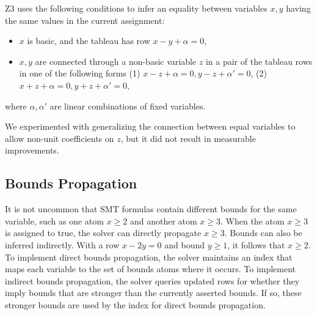 Z3 uses the following conditions to infer an equality between variables $x, y$ having the same values in the current assignment:
\begin{itemize}
    \item $x$ is basic, and the tableau has row $x - y + \alpha = 0$,
    \item $x, y$ are connected through a non-basic variable $z$ in a pair of the tableau rows in one of the following forms
	(1) $x - z + \alpha = 0, y - z + \alpha' = 0$, (2) $x + z + \alpha = 0, y + z + \alpha' = 0$, 	
\end{itemize}
where $\alpha, \alpha'$ are linear combinations of fixed variables.

We experimented with generalizing the connection between equal variables to
allow non-unit coefficients on $z$, but it did not result in measurable improvements.


\subsection{Bounds Propagation}
\label{sec:bounds-propagation}
It is not uncommon that SMT formulas contain different bounds for the same variable, such as one atom $x \geq 2$ and another atom $x \geq 3$.
When the atom $x \geq 3$ is assigned to true, the solver can directly propagate $x \geq 3$. Bounds can also be inferred indirectly.
With a row $x - 2y = 0$ and bound $y \geq 1$, it follows that $x \geq 2$. To implement direct bounds propagation, the solver
maintains an index that maps each variable to the set of bounds atoms where it occurs. To implement indirect bounds propagation,
the solver queries updated rows for whether they imply bounds that are stronger than the currently asserted bounds. If so, these
stronger bounds are used by the index for direct bounds propagation.
